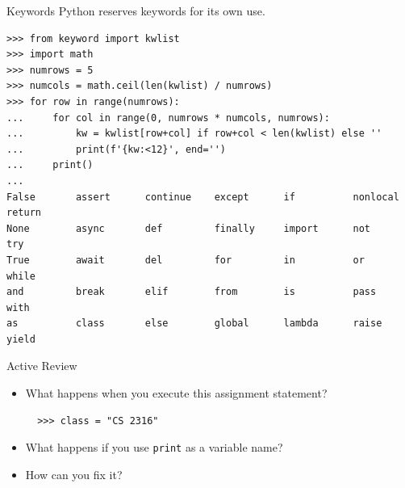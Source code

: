 \documentclass[smaller, aspectratio=1610]{beamer}
\begin{document}
\begin{frame}[label={sec:orgd32c467},fragile]{Keywords}
 Python reserves keywords for its own use.

\lstset{language=Python,label= ,caption= ,captionpos=b,numbers=none}
\begin{lstlisting}
>>> from keyword import kwlist
>>> import math
>>> numrows = 5
>>> numcols = math.ceil(len(kwlist) / numrows)
>>> for row in range(numrows):
...     for col in range(0, numrows * numcols, numrows):
...         kw = kwlist[row+col] if row+col < len(kwlist) else ''
...         print(f'{kw:<12}', end='')
...     print()
...
False       assert      continue    except      if          nonlocal    return
None        async       def         finally     import      not         try
True        await       del         for         in          or          while
and         break       elif        from        is          pass        with
as          class       else        global      lambda      raise       yield
\end{lstlisting}


\begin{block}{Active Review}
\begin{itemize}
\item What happens when you execute this assignment statement?

\lstset{language=Python,label= ,caption= ,captionpos=b,numbers=none}
\begin{lstlisting}
  >>> class = "CS 2316"
\end{lstlisting}

\item What happens if you use \texttt{print} as a variable name?
\item How can you fix it?
\end{itemize}
\end{block}
\end{frame}
\end{document}
